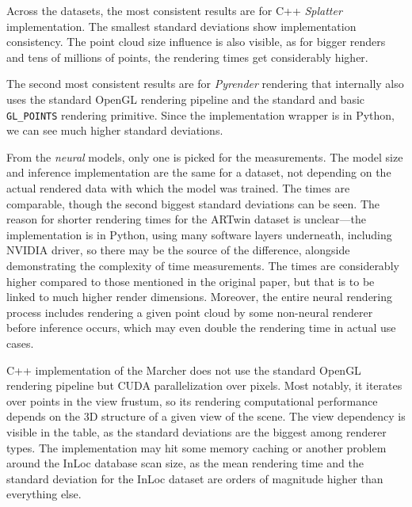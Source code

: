 Across the datasets, the most consistent results are for C++ \emph{Splatter}
implementation. The smallest standard deviations show
implementation consistency. The point cloud size influence is also visible,
as for bigger renders and tens of millions of points, the rendering times
get considerably higher.

The second most consistent results are for
\emph{Pyrender} rendering that internally also uses the standard OpenGL
rendering pipeline and the standard and basic \verb|GL_POINTS| rendering
primitive. Since the implementation wrapper is in Python, we can see much
higher standard deviations.

From the \emph{neural} models, only one is picked for the measurements.
The model size and inference implementation are the same for a dataset, not
depending on the actual rendered data with which the model was trained. The times
are comparable, though the second biggest standard deviations can be seen.
The reason for shorter rendering times for the ARTwin dataset is unclear---the
implementation is in Python, using many software layers underneath, including
NVIDIA driver, so there may be the source of the difference,
alongside demonstrating the complexity of time measurements. The times
are considerably higher compared to those mentioned in the original paper,
but that is to be linked to much higher render dimensions. Moreover, the entire
neural rendering process includes rendering a given point cloud by some
non-neural renderer before inference occurs, which may even double the
rendering time in actual use cases.

C++ implementation of the Marcher does not use the standard OpenGL rendering
pipeline but CUDA parallelization over pixels. Most notably, it
iterates over points in the view frustum, so its rendering computational
performance depends on the 3D structure of a given view of the scene. The
view dependency is  visible in the table, as the standard deviations are
the biggest among renderer types. The implementation may hit some memory
caching or another problem around the InLoc database scan size, as the mean
rendering time and the standard deviation for the InLoc dataset are orders
of magnitude higher than everything else.



